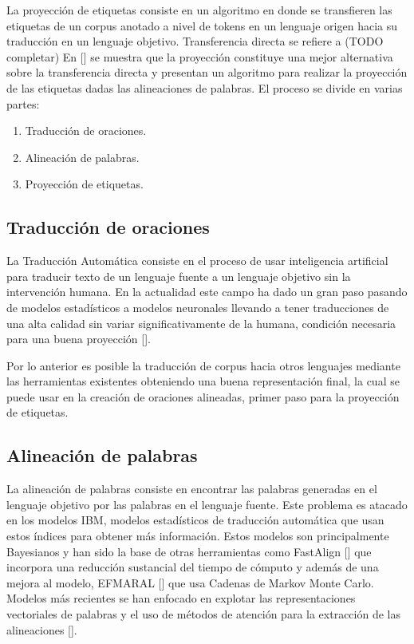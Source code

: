 La proyección de etiquetas consiste en un algoritmo en donde se 
transfieren las etiquetas de un corpus anotado a nivel de tokens en un lenguaje origen hacia su traducción en un 
lenguaje objetivo. Transferencia directa se refiere a (TODO completar)
En [\cite{eger2018cross}] se muestra que la proyección constituye una mejor alternativa sobre la transferencia
directa y presentan un algoritmo para realizar la proyección de las etiquetas dadas las alineaciones de palabras.
El proceso se divide en varias partes:

\begin{enumerate}
	\item Traducción de oraciones.
	\item Alineación de palabras.
	\item Proyección de etiquetas.
\end{enumerate}

\subsection{Traducción de oraciones}

La Traducción Automática consiste en el proceso de usar inteligencia artificial para
traducir texto de un lenguaje fuente a un lenguaje objetivo sin la intervención humana.
En la actualidad este campo ha dado un gran paso pasando de modelos estadísticos a modelos
neuronales llevando a tener traducciones de una alta calidad sin variar significativamente de la humana, 
condición necesaria para una buena proyección [\cite{eger2018cross}].

Por lo anterior es posible la traducción de corpus hacia otros lenguajes mediante las
herramientas existentes obteniendo una buena representación final, la cual se puede usar en la creación de
oraciones alineadas, primer paso para la proyección de etiquetas.

\subsection{Alineación de palabras}

La alineación de palabras consiste en encontrar las palabras generadas en el lenguaje objetivo por las 
palabras en el lenguaje fuente.
Este problema es atacado en los modelos IBM, modelos estadísticos de traducción automática que usan estos 
índices para obtener más información. Estos modelos son principalmente Bayesianos y han sido la base de
otras herramientas como FastAlign [\cite{dyer2013fastalign}] que incorpora una reducción sustancial del
tiempo de cómputo y además de una mejora al modelo, EFMARAL [\cite{ostling2016efficient}] que usa
Cadenas de Markov Monte Carlo. Modelos más recientes se han enfocado en explotar las representaciones
vectoriales de palabras y el uso de métodos de atención para la extracción de las
alineaciones [\cite{dou2021word}].


